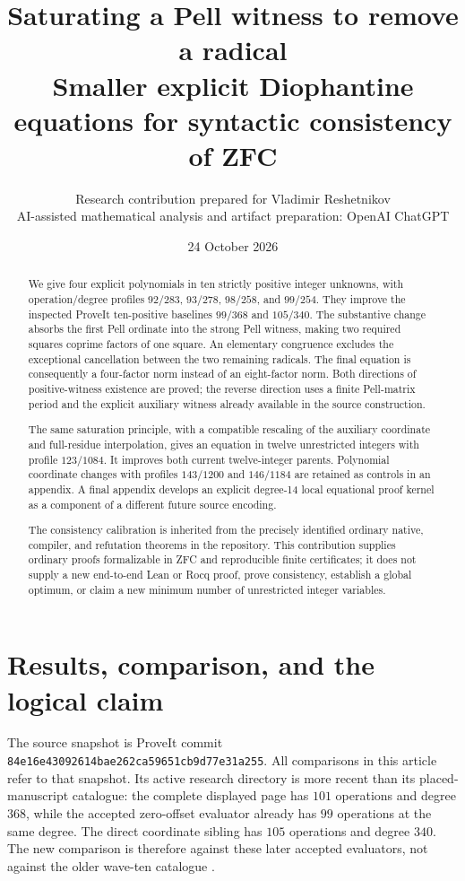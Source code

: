 \documentclass[11pt,letterpaper]{article}
\title{Saturating a Pell witness to remove a radical\\[4pt]
\large Smaller explicit Diophantine equations for syntactic consistency of ZFC}
\author{Research contribution prepared for Vladimir Reshetnikov\\
\small AI-assisted mathematical analysis and artifact preparation: OpenAI ChatGPT}
\date{24 October 2026}
\theoremstyle{remark}\newtheorem{remark}[theorem]{Remark}
\newcommand{\sha}{\texttt{84e16e43092614bae262ca59651cb9d77e31a255}}
\begin{document}
\maketitle
\begin{abstract}
We give four explicit polynomials in ten strictly positive integer
unknowns, with operation/degree profiles
$92/283$, $93/278$, $98/258$, and $99/254$.
They improve the inspected ProveIt ten-positive baselines $99/368$ and
$105/340$.  The substantive change absorbs the first Pell ordinate into
the strong Pell witness, making two required squares coprime factors of
one square.  An elementary congruence excludes the exceptional cancellation
between the two remaining radicals.  The final equation is consequently
a four-factor norm instead of an eight-factor norm.  Both directions of
positive-witness existence are proved; the reverse direction uses a finite
Pell-matrix period and the explicit auxiliary witness already available in
the source construction.

The same saturation principle, with a compatible rescaling of the
auxiliary coordinate and full-residue interpolation, gives an equation
in twelve unrestricted integers with profile $123/1084$.  It improves
both current twelve-integer parents.  Polynomial coordinate changes
with profiles $143/1200$ and $146/1184$ are retained as controls in an
appendix.  A final appendix develops an
explicit degree-14 local equational proof kernel as a component of a
different future source encoding.

The consistency calibration is inherited from the precisely identified
ordinary native, compiler, and refutation theorems in the repository.  This
contribution supplies ordinary proofs formalizable in ZFC and reproducible
finite certificates; it does not supply a new end-to-end Lean or Rocq proof,
prove consistency, establish a global optimum, or claim a new minimum
number of unrestricted integer variables.
\end{abstract}
\tableofcontents
\newpage

\section{Results, comparison, and the logical claim}

The source snapshot is ProveIt commit \sha.  All comparisons in this
article refer to that snapshot.  Its active research directory is more
recent than its placed-manuscript catalogue: the complete displayed page
has $101$ operations and degree $368$, while the accepted zero-offset
evaluator already has $99$ operations at the same degree.  The direct
coordinate sibling has $105$ operations and degree $340$.
The new comparison is therefore against these later accepted evaluators,
not against the older wave-ten catalogue \cite{repo,zero,direct}.
\end{document}
